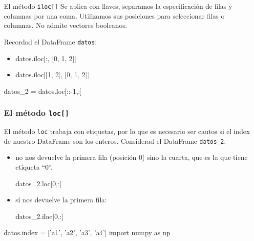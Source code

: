 \documentclass[9pt]{beamer}
\begin{document}
\begin{frame}[fragile]
  
  \begin{block}{El método {\tt iloc[]}}
    Se aplica con llaves, separamos la especificación de filas y columnas por una coma. Utilizamos sus posiciones para seleccionar filas o columnas. No admite vectores  booleanos.
  \end{block}

  \pause
  Recordad el DataFrame {\tt datos}:\smallskip

  
\begin{itemize}
  \item<3-> 
    \begin{pyconsole}
datos.iloc[:, [0, 1, 2]]
    \end{pyconsole}
  \item<4->
    \begin{pyconsole}
datos.iloc[[1, 2], [0, 1, 2]]
    \end{pyconsole}
\end{itemize}
\end{frame}

 \begin{pyconcode}
datos_2 = datos.loc[::-1,:]
  \end{pyconcode}
\begin{frame}[fragile]
  \frametitle{El método {\tt loc[]}}
  El método {\tt loc} trabaja con etiquetas, por lo que es necesario ser cautos si el index de nuestro DataFrame son los enteros. Considerad el DataFrame {\tt datos\_2}:\smallskip

  \begin{itemize}
  \item<2->
   no nos devuelve la primera fila (posición 0) sino la cuarta, que es la que tiene etiqueta ``0''.

    \begin{pyconsole}
datos_2.loc[0,:]
    \end{pyconsole}
  \item<3-> 
     sí nos devuelve la primera fila:

    \begin{pyconsole}
datos_2.iloc[0,:]
    \end{pyconsole}
  \end{itemize}
\end{frame}
\begin{pyconcode}
datos.index = ['a1', 'a2', 'a3', 'a4']
import numpy as np
\end{pyconcode}
\end{document}
